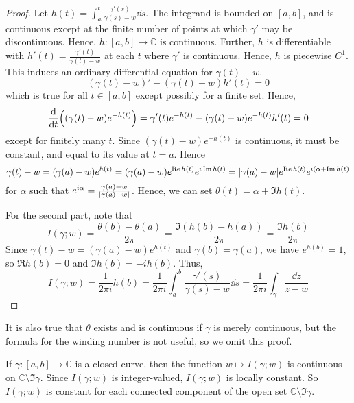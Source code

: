 \begin{proof}
	Let \( h(t) = \int_a^t \frac{\gamma'(s)}{\gamma(s) - w} \dd{s} \).
	The integrand is bounded on \( [a,b] \), and is continuous except at the finite number of points at which \( \gamma' \) may be discontinuous.
	Hence, \( h \colon [a,b] \to \mathbb C \) is continuous.
	Further, \( h \) is differentiable with \( h'(t) = \frac{\gamma'(t)}{\gamma(t) - w} \) at each \( t \) where \( \gamma' \) is continuous.
	Hence, \( h \) is piecewise \( C^1 \).
	This induces an ordinary differential equation for \( \gamma(t) - w \).
	\[
		(\gamma(t) - w)' - (\gamma(t) - w)h'(t) = 0
	\]
	which is true for all \( t \in [a,b] \) except possibly for a finite set.
	Hence,
	\[
		\dv{t} \qty((\gamma(t) - w) e^{-h(t)}) = \gamma'(t) e^{-h(t)} - (\gamma(t) - w)e^{-h(t)} h'(t) = 0
	\]
	except for finitely many \( t \).
	Since \( (\gamma(t) - w)e^{-h(t)} \) is continuous, it must be constant, and equal to its value at \( t = a \).
	Hence
	\[
		\gamma(t) - w = (\gamma(a) - w)e^{h(t)} = (\gamma(a) - w)e^{\Re h(t)} e^{i\Im h(t)} = \abs{\gamma(a)-w} e^{\Re h(t)} e^{i(\alpha + \Im h(t)}
	\]
	for \( \alpha \) such that \( e^{i\alpha} = \frac{\gamma(a) - w}{\abs{\gamma(a) - w}} \).
	Hence, we can set \( \theta(t) = \alpha + \Im h(t) \).

	For the second part, note that
	\[
		I(\gamma;w) = \frac{\theta(b) - \theta(a)}{2\pi} = \frac{\Im(h(b) - h(a))}{2\pi} = \frac{\Im h(b)}{2\pi}
	\]
	Since \( \gamma(t) - w = (\gamma(a) - w)e^{h(t)} \) and \( \gamma(b) = \gamma(a) \), we have \( e^{h(b)} = 1 \), so \( \Re h(b) = 0 \) and \( \Im h(b) = -i h(b) \).
	Thus,
	\[
		I(\gamma;w) = \frac{1}{2\pi i} h(b) = \frac{1}{2\pi i} \int_a^b \frac{\gamma'(s)}{\gamma(s) - w} \dd{s} = \frac{1}{2\pi i} \int_\gamma \frac{\dd{z}}{z-w}
	\]
\end{proof}
\begin{remark}
	It is also true that \( \theta \) exists and is continuous if \( \gamma \) is merely continuous, but the formula for the winding number is not useful, so we omit this proof.
\end{remark}
\begin{proposition}
	If \( \gamma \colon [a,b] \to \mathbb C \) is a closed curve, then the function \( w \mapsto I(\gamma;w) \) is continuous on \( \mathbb C \setminus \Im \gamma \).
	Since \( I(\gamma;w) \) is integer-valued, \( I(\gamma;w) \) is locally constant.
	So \( I(\gamma;w) \) is constant for each connected component of the open set \( \mathbb C \setminus \Im \gamma \).
\end{proposition}
